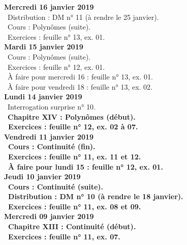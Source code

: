 \documentclass[12pt,a4paper]{article}
\begin{document}
\noindent\textbf{Mercredi 16 janvier 2019} \\
\bu\ Distribution : DM n° 11 (à rendre le 25 janvier).\\
\bu\ Cours : Polynômes (suite).\\
\bu\ Exercices : feuille n° 13, ex. 01.\vspace{.4cm}\\

\noindent\textbf{Mardi 15 janvier 2019} \\
\bu\ Cours : Polynômes (suite).\\
\bu\ Exercices : feuille n° 12, ex. 01.\\
\bu\ À faire pour mercredi 16 : feuille n° 13, ex. 01.\\
\bu\ À faire pour vendredi 18 : feuille n° 13, ex. 02.\vspace{.4cm}\\
 
\noindent\textbf{Lundi 14 janvier 2019} \\
\bu\ Interrogation surprise n° 10.\\
\bu\ \bf Chapitre XIV \rm : Polynômes (début).\\
\bu\ Exercices : feuille n° 12, ex. 02 à 07.\vspace{.4cm}\\

\noindent\textbf{Vendredi 11 janvier 2019}\\
\bu\ Cours : Continuité (fin).\\
\bu\ Exercices : feuille n° 11, ex. 11 et 12.\\
\bu\ À faire pour lundi 15 : feuille n° 12, ex. 01.\vspace{.4cm}\\
 
\noindent\textbf{Jeudi 10 janvier 2019}\\
\bu\ Cours : Continuité (suite).\\
\bu\ Distribution : DM n° 10 (à rendre le 18 janvier).\\
\bu\ Exercices : feuille n° 11, ex. 08 et 09.\vspace{.4cm}\\
 
\noindent\textbf{Mercredi 09 janvier 2019} \\
\bu\ \bf Chapitre XIII \rm : Continuité (début).\\
\bu\ Exercices : feuille n° 11, ex. 07.\vspace{.4cm}\\
 
\end{document}
